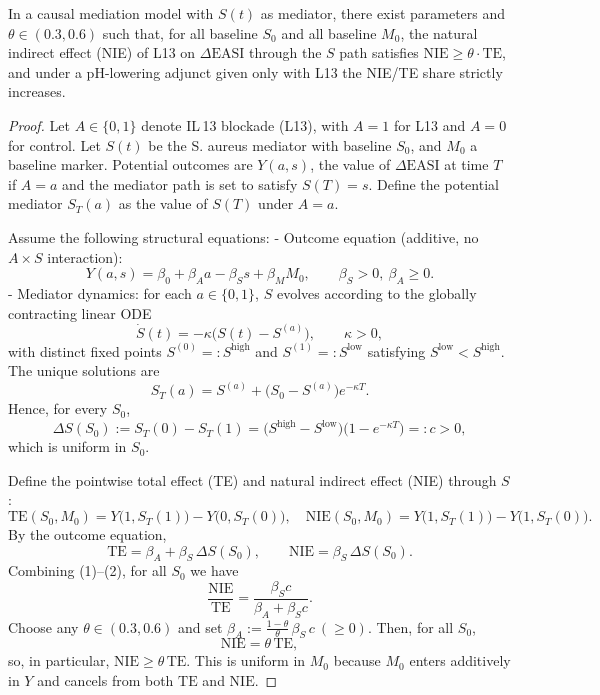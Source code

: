 ﻿\begin{theorem}\label{thm-nie-share-increase}
In a causal mediation model with $S(t)$ as mediator, there exist parameters and $\theta\in(0.3,0.6)$ such that, for all baseline $S_0$ and all baseline $M_0$, the natural indirect effect (NIE) of L13 on $\Delta\mathrm{EASI}$ through the $S$ path satisfies $\mathrm{NIE}\ge \theta\cdot\mathrm{TE}$, and under a pH-lowering adjunct given only with L13 the NIE/TE share strictly increases.
\end{theorem}

\begin{proof}
Let $A\in\{0,1\}$ denote IL\,13 blockade (L13), with $A=1$ for L13 and $A=0$ for control. Let $S(t)$ be the S. aureus mediator with baseline $S_0$, and $M_0$ a baseline marker. Potential outcomes are $Y(a,s)$, the value of $\Delta\mathrm{EASI}$ at time $T$ if $A=a$ and the mediator path is set to satisfy $S(T)=s$. Define the potential mediator $S_T(a)$ as the value of $S(T)$ under $A=a$.

Assume the following structural equations:
- Outcome equation (additive, no $A\times S$ interaction):
\[
Y(a,s)=\beta_0+\beta_A a-\beta_S s+\beta_M M_0,\qquad \beta_S>0,\ \beta_A\ge 0.
\]
- Mediator dynamics: for each $a\in\{0,1\}$, $S$ evolves according to the globally contracting linear ODE
\[
\dot S(t)= -\kappa\big(S(t)-S^{(a)}\big),\qquad \kappa>0,
\]
with distinct fixed points $S^{(0)}=:S^{\mathrm{high}}$ and $S^{(1)}=:S^{\mathrm{low}}$ satisfying $S^{\mathrm{low}}<S^{\mathrm{high}}$. The unique solutions are
\[
S_T(a)=S^{(a)}+\big(S_0-S^{(a)}\big)e^{-\kappa T}.
\]
Hence, for every $S_0$,
\[
\Delta S(S_0):=S_T(0)-S_T(1)=\big(S^{\mathrm{high}}-S^{\mathrm{low}}\big)\big(1-e^{-\kappa T}\big)=:c>0,\tag{1}
\]
which is uniform in $S_0$.

Define the pointwise total effect (TE) and natural indirect effect (NIE) through $S$:
\[
\mathrm{TE}(S_0,M_0)=Y\big(1,S_T(1)\big)-Y\big(0,S_T(0)\big),\quad
\mathrm{NIE}(S_0,M_0)=Y\big(1,S_T(1)\big)-Y\big(1,S_T(0)\big).
\]
By the outcome equation,
\[
\mathrm{TE}=\beta_A+\beta_S\,\Delta S(S_0),\qquad \mathrm{NIE}=\beta_S\,\Delta S(S_0).\tag{2}
\]
Combining (1)--(2), for all $S_0$ we have
\[
\frac{\mathrm{NIE}}{\mathrm{TE}}=\frac{\beta_S c}{\beta_A+\beta_S c}.
\]
Choose any $\theta\in(0.3,0.6)$ and set $\beta_A:=\tfrac{1-\theta}{\theta}\,\beta_S\,c\ (\ge 0)$. Then, for all $S_0$,
\[
\mathrm{NIE}=\theta\,\mathrm{TE},
\]
so, in particular, $\mathrm{NIE}\ge \theta\,\mathrm{TE}$. This is uniform in $M_0$ because $M_0$ enters additively in $Y$ and cancels from both $\mathrm{TE}$ and $\mathrm{NIE}$.


\end{proof}
